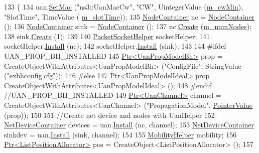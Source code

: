 \begin{DoxyCode}
133 \{
134   uan.\hyperlink{classns3_1_1UanHelper_a1c99a2afa329597107452c42eb9c43b9}{SetMac} (\textcolor{stringliteral}{"ns3::UanMacCw"}, \textcolor{stringliteral}{"CW"}, UintegerValue (\hyperlink{classExperiment_a2dbf3ad2a9b3a535c8bb9bb128e47ad3}{m\_cwMin}), \textcolor{stringliteral}{"SlotTime"}, TimeValue (
      \hyperlink{classExperiment_a72df8f8bffaba83db6821d0cf5b593fb}{m\_slotTime}));
135   \hyperlink{classns3_1_1NodeContainer}{NodeContainer} nc = \hyperlink{classns3_1_1NodeContainer}{NodeContainer} ();
136   \hyperlink{classns3_1_1NodeContainer}{NodeContainer} sink = \hyperlink{classns3_1_1NodeContainer}{NodeContainer} ();
137   nc.\hyperlink{classns3_1_1NodeContainer_a787f059e2813e8b951cc6914d11dfe69}{Create} (\hyperlink{classExperiment_ac22115998156e9cbf5a2112a1ec9b6bb}{m\_numNodes});
138   sink.\hyperlink{classns3_1_1NodeContainer_a787f059e2813e8b951cc6914d11dfe69}{Create} (1);
139 
140   \hyperlink{classns3_1_1PacketSocketHelper}{PacketSocketHelper} socketHelper;
141   socketHelper.\hyperlink{classns3_1_1PacketSocketHelper_a33f449fee7fd10411949d17feba6d33e}{Install} (nc);
142   socketHelper.\hyperlink{classns3_1_1PacketSocketHelper_a33f449fee7fd10411949d17feba6d33e}{Install} (sink);
143 
144 \textcolor{preprocessor}{#ifdef UAN\_PROP\_BH\_INSTALLED}
145   \hyperlink{classns3_1_1Ptr}{Ptr<UanPropModelBh>} prop = CreateObjectWithAttributes<UanPropModelBh> (\textcolor{stringliteral}{"ConfigFile"}, 
      StringValue (\textcolor{stringliteral}{"exbhconfig.cfg"}));
146 \textcolor{preprocessor}{#else }
147   \hyperlink{classns3_1_1Ptr}{Ptr<UanPropModelIdeal>} prop = CreateObjectWithAttributes<UanPropModelIdeal> ();
148 \textcolor{preprocessor}{#endif //UAN\_PROP\_BH\_INSTALLED}
149   \hyperlink{classns3_1_1Ptr}{Ptr<UanChannel>} channel = CreateObjectWithAttributes<UanChannel> (\textcolor{stringliteral}{"PropagationModel"}, 
      \hyperlink{classns3_1_1PointerValue}{PointerValue} (prop));
150 
151   \textcolor{comment}{//Create net device and nodes with UanHelper}
152   \hyperlink{classns3_1_1NetDeviceContainer}{NetDeviceContainer} devices = uan.\hyperlink{classns3_1_1UanHelper_a283475798bb2df2ff11c53b68d2f1361}{Install} (nc, channel);
153   \hyperlink{classns3_1_1NetDeviceContainer}{NetDeviceContainer} sinkdev = uan.\hyperlink{classns3_1_1UanHelper_a283475798bb2df2ff11c53b68d2f1361}{Install} (sink, channel);
154 
155   \hyperlink{classns3_1_1MobilityHelper}{MobilityHelper} mobility;
156   \hyperlink{classns3_1_1Ptr}{Ptr<ListPositionAllocator>} pos = CreateObject<ListPositionAllocator> ();
157 

\end{DoxyCode}
